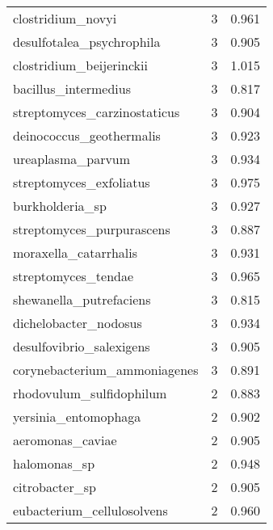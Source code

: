 \begin{tabular}{lrr}
                           clostridium\_novyi &                   3 &     0.961 \\
                   desulfotalea\_psychrophila &                   3 &     0.905 \\
                    clostridium\_beijerinckii &                   3 &     1.015 \\
                        bacillus\_intermedius &                   3 &     0.817 \\
                streptomyces\_carzinostaticus &                   3 &     0.904 \\
                    deinococcus\_geothermalis &                   3 &     0.923 \\
                           ureaplasma\_parvum &                   3 &     0.934 \\
                     streptomyces\_exfoliatus &                   3 &     0.975 \\
                             burkholderia\_sp &                   3 &     0.927 \\
                   streptomyces\_purpurascens &                   3 &     0.887 \\
                       moraxella\_catarrhalis &                   3 &     0.931 \\
                         streptomyces\_tendae &                   3 &     0.965 \\
                     shewanella\_putrefaciens &                   3 &     0.815 \\
                       dichelobacter\_nodosus &                   3 &     0.934 \\
                    desulfovibrio\_salexigens &                   3 &     0.905 \\
                corynebacterium\_ammoniagenes &                   3 &     0.891 \\
                    rhodovulum\_sulfidophilum &                   2 &     0.883 \\
                        yersinia\_entomophaga &                   2 &     0.902 \\
                            aeromonas\_caviae &                   2 &     0.905 \\
                                halomonas\_sp &                   2 &     0.948 \\
                              citrobacter\_sp &                   2 &     0.905 \\
                  eubacterium\_cellulosolvens &                   2 &     0.960 \\

\end{tabular}
